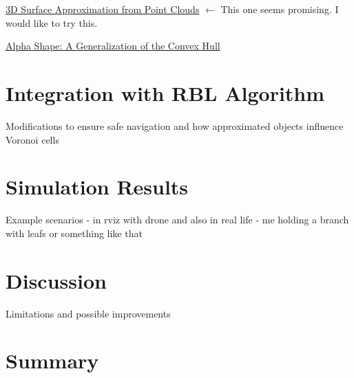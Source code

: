 
\href{https://groups.inf.ed.ac.uk/advr/papers/3D_Surface_Approximation_from_Point_Clouds.pdf}{3D Surface Approximation from Point Clouds} $\leftarrow$ This one seems promising. I would like to try this.


\href{https://en.wikipedia.org/wiki/Alpha_shape}{Alpha Shape: A Generalization of the Convex Hull}



\section{Integration with RBL Algorithm}

Modifications to ensure safe navigation and how approximated objects influence Voronoi cells

\section{Simulation Results}

Example scenarios - in rviz with drone and also in real life - me holding a branch with leafs or something like that

\section{Discussion}

Limitations and possible improvements

\section{Summary}